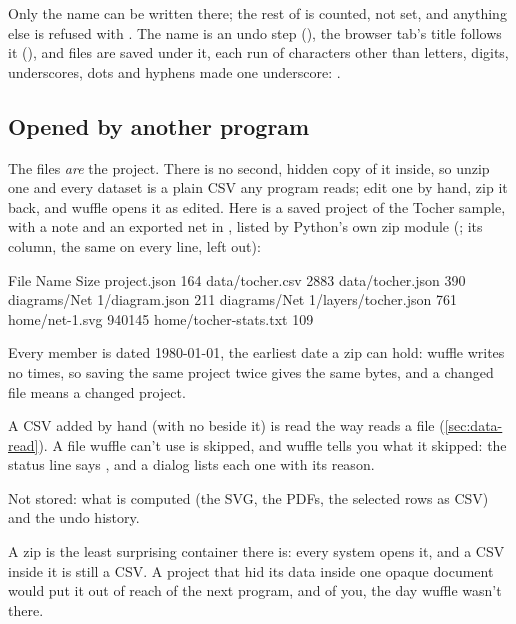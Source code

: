 Only the name can be written there; the rest of  is counted, not set, and anything
else is refused with . The name
is an undo step (), the browser tab's title follows it (),
and files are saved under it, each run of characters other than letters, digits, underscores, dots and
hyphens made one underscore: .

\subsection{Opened by another program}

The files \emph{are} the project. There is no second, hidden copy of it inside, so unzip one and every
dataset is a plain CSV any program reads; edit one by hand, zip it back, and wuffle opens it as edited.
Here is a saved project of the Tocher sample, with a note and an exported net in , listed by
Python's own zip module (; its 
column, the same on every line, left out):

\begin{codeblock}
File Name                                Size
project.json                              164
data/tocher.csv                          2883
data/tocher.json                          390
diagrams/Net 1/diagram.json               211
diagrams/Net 1/layers/tocher.json         761
home/net-1.svg                         940145
home/tocher-stats.txt                     109
\end{codeblock}

Every member is dated 1980-01-01, the earliest date a zip can hold: wuffle writes no times, so saving
the same project twice gives the same bytes, and a changed file means a changed project.

A CSV added by hand (with no  beside it) is read the way  reads a file
(\cref{sec:data-read}). A file wuffle can't use is skipped, and wuffle tells you what it skipped: the
status line says , and a dialog lists each one with its
reason.

Not stored: what is computed (the SVG, the PDFs, the selected rows as CSV) and the undo history.

\begin{why}
A zip is the least surprising container there is: every system opens it, and a CSV inside it is still a
CSV. A project that hid its data inside one opaque document would put it out of reach of the next
program, and of you, the day wuffle wasn't there.
\end{why}

